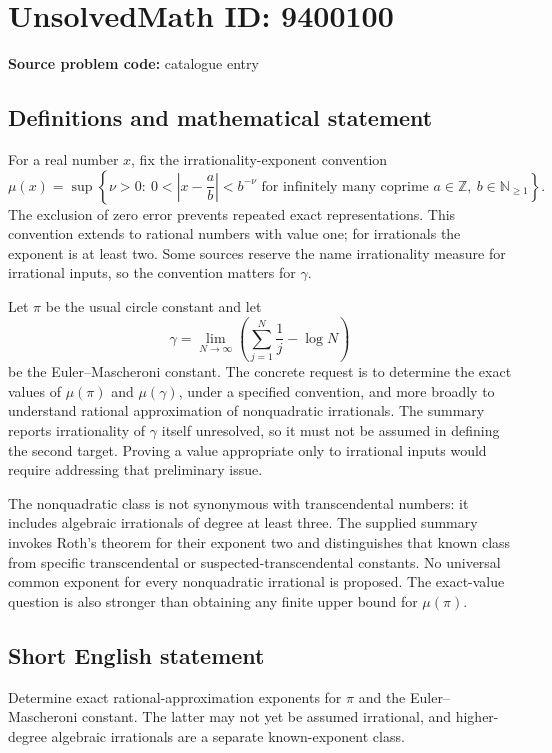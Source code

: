 \documentclass[11pt]{article}
\newcommand{\N}{\mathbb{N}}
\newcommand{\Z}{\mathbb{Z}}
\begin{document}
\section*{UnsolvedMath ID: 9400100}
\textbf{Source problem code:} catalogue entry
\subsection{Definitions and mathematical statement}
For a real number $x$, fix the irrationality-exponent convention
\[
\mu(x)=\sup\left\{\nu>0:\ 0<\left|x-\frac ab\right|<b^{-\nu}
\text{ for infinitely many coprime }a\in\Z,\ b\in\N_{\geq1}\right\}.
\]
The exclusion of zero error prevents repeated exact representations. This convention extends to rational numbers with value one; for irrationals the exponent is at least two. Some sources reserve the name irrationality measure for irrational inputs, so the convention matters for $\gamma$.

Let $\pi$ be the usual circle constant and let
\[
\gamma=\lim_{N\to\infty}\left(\sum_{j=1}^N\frac1j-\log N\right)
\]
be the Euler--Mascheroni constant. The concrete request is to determine the exact values of $\mu(\pi)$ and $\mu(\gamma)$, under a specified convention, and more broadly to understand rational approximation of nonquadratic irrationals. The summary reports irrationality of $\gamma$ itself unresolved, so it must not be assumed in defining the second target. Proving a value appropriate only to irrational inputs would require addressing that preliminary issue.

The nonquadratic class is not synonymous with transcendental numbers: it includes algebraic irrationals of degree at least three. The supplied summary invokes Roth's theorem for their exponent two and distinguishes that known class from specific transcendental or suspected-transcendental constants. No universal common exponent for every nonquadratic irrational is proposed. The exact-value question is also stronger than obtaining any finite upper bound for $\mu(\pi)$.
\subsection{Short English statement}
Determine exact rational-approximation exponents for $\pi$ and the Euler--Mascheroni constant. The latter may not yet be assumed irrational, and higher-degree algebraic irrationals are a separate known-exponent class.
\end{document}
